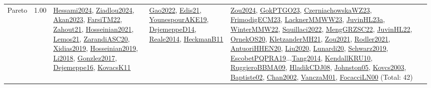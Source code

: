 {\begin{longtable}{p{3cm}r>{\raggedright\arraybackslash}p{6cm}>{\raggedright\arraybackslash}p{6cm}>{\raggedright\arraybackslash}p{8cm}}
\index{Pareto}\index{Concepts!Pareto}Pareto &  1.00 & \hyperref[detail:Hessami2024]{Hessami2024}, \hyperref[detail:Ziadlou2024]{Ziadlou2024}, \hyperref[detail:Akan2023]{Akan2023}, \hyperref[detail:FarsiTM22]{FarsiTM22}, \hyperref[detail:Zahout21]{Zahout21}, \hyperref[detail:Hosseinian2021]{Hosseinian2021}, \hyperref[detail:Lemos21]{Lemos21}, \hyperref[detail:ZarandiASC20]{ZarandiASC20}, \hyperref[detail:Xidias2019]{Xidias2019}, \hyperref[detail:Hosseinian2019]{Hosseinian2019}, \hyperref[detail:Li2018]{Li2018}, \hyperref[detail:Gonzlez2017]{Gonzlez2017}, \hyperref[detail:Dejemeppe16]{Dejemeppe16}, \hyperref[detail:KovacsK11]{KovacsK11} & \hyperref[detail:Gao2022]{Gao2022}, \hyperref[detail:Edis21]{Edis21}, \hyperref[detail:YounespourAKE19]{YounespourAKE19}, \hyperref[detail:DejemeppeD14]{DejemeppeD14}, \hyperref[detail:Reale2014]{Reale2014}, \hyperref[detail:HeckmanB11]{HeckmanB11} & \hyperref[detail:Zou2024]{Zou2024}, \hyperref[detail:GokPTGO23]{GokPTGO23}, \hyperref[detail:CzerniachowskaWZ23]{CzerniachowskaWZ23}, \hyperref[detail:FrimodigECM23]{FrimodigECM23}, \hyperref[detail:LacknerMMWW23]{LacknerMMWW23}, \hyperref[detail:JuvinHL23a]{JuvinHL23a}, \hyperref[detail:WinterMMW22]{WinterMMW22}, \hyperref[detail:Squillaci2022]{Squillaci2022}, \hyperref[detail:MengGRZSC22]{MengGRZSC22}, \hyperref[detail:JuvinHL22]{JuvinHL22}, \hyperref[detail:OrnekOS20]{OrnekOS20}, \hyperref[detail:KletzanderMH21]{KletzanderMH21}, \hyperref[detail:Zou2021]{Zou2021}, \hyperref[detail:Rodler2021]{Rodler2021}, \hyperref[detail:AntuoriHHEN20]{AntuoriHHEN20}, \hyperref[detail:Liu2020]{Liu2020}, \hyperref[detail:Lunardi20]{Lunardi20}, \hyperref[detail:Schwarz2019]{Schwarz2019}, \hyperref[detail:EscobetPQPRA19]{EscobetPQPRA19}...\hyperref[detail:Tang2014]{Tang2014}, \hyperref[detail:KendallKRU10]{KendallKRU10}, \hyperref[detail:RuggieroBBMA09]{RuggieroBBMA09}, \hyperref[detail:HladikCDJ08]{HladikCDJ08}, \hyperref[detail:Johnston05]{Johnston05}, \hyperref[detail:Kovcs2003]{Kovcs2003}, \hyperref[detail:Baptiste02]{Baptiste02}, \hyperref[detail:Chan2002]{Chan2002}, \hyperref[detail:VanczaM01]{VanczaM01}, \hyperref[detail:FocacciLN00]{FocacciLN00} (Total: 42)\\

\end{longtable}}
